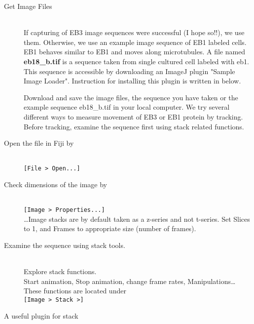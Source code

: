 \documentclass[11pnt]{article}
\begin{document}
\begin{description}

\item[Get Image Files]\hfill\\

If capturing of EB3 image sequences were successful (I hope so!!), we use them. Otherwise, we use an example image sequence of EB1 labeled cells. EB1 behaves similar to EB1 and moves along microtubules. A file named \textbf{eb18\_b.tif} is a sequence taken from single cultured cell labeled with eb1. This sequence is accessible by downloading an ImageJ plugin "Sample Image Loader". Instruction for installing this plugin is written in below.  

Download and save the image files, the sequence you have taken or the example sequence eb18\_b.tif in your local computer. We try several different ways to measure movement of EB3 or EB1 protein by tracking. Before tracking, examine the sequence first using stack related functions. 

\item[Open the file in Fiji by]\hfill\\

\verb"[File > Open...]"\\

\item[Check dimensions of the image by]\hfill\\
\verb"[Image > Properties...]"\\

\dots Image stacks are by default taken as a z-series and not t-series. Set Slices to 1, and Frames to appropriate size (number of frames).

\item[Examine the sequence using stack tools.]\hfill\\

Explore stack functions. \\
Start animation, Stop animation, change frame rates, Manipulations\dots These functions are located under\hfill\\

\verb"[Image > Stack >]"\\

\item[A useful plugin for stack]\hfill\\


\end{description}
\end{document}
